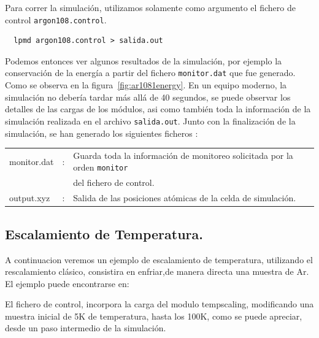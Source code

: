 Para correr la simulaci\'on, utilizamos solamente como argumento el fichero de control \verb|argon108.control|.
\begin{verbatim}
  lpmd argon108.control > salida.out
\end{verbatim}


Podemos entonces ver algunos resultados de la simulaci\'on, por ejemplo la conservaci\'on de la energ\'ia a partir del fichero \verb|monitor.dat| que fue generado. Como se observa en la figura~\ref{fig:ar1081energy}. En un equipo moderno, la simulaci\'on no deber\'ia tardar m\'as all\'a de 40 segundos, se puede observar los detalles de las cargas de los m\'odulos, asi como tambi\'en toda la informaci\'on de la simulaci\'on realizada en el archivo \verb|salida.out|. Junto con la finalizaci\'on de la simulaci\'on, se han generado los siguientes ficheros :

\begin{tabular}{lcl}\\
 monitor.dat &:& Guarda toda la informaci\'on de monitoreo solicitada por la orden \verb|monitor|\\
&& del fichero de control. \\
 output.xyz &:& Salida de las posiciones at\'omicas de la celda de simulaci\'on. \\
\end{tabular}

\subsection{Escalamiento de Temperatura.}

A continuacion veremos un ejemplo de escalamiento de temperatura, utilizando el rescalamiento cl\'asico, consistira en enfriar,de manera directa una muestra de Ar. El ejemplo puede encontrarse en:


El fichero de control, incorpora la carga del modulo tempscaling, modificando una muestra inicial de 5K de temperatura, hasta los 100K, como se puede apreciar, desde un paso intermedio de la simulaci\'on.

